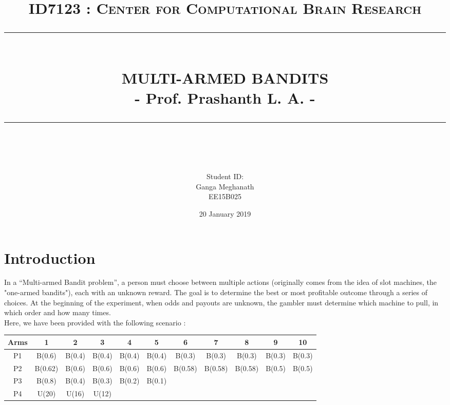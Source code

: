\documentclass[12pt]{report}
\newcommand{\HRule}[1]{\rule{\linewidth}{#1}}
\begin{document}
\title{ \normalsize \textsc{ID7123 : Center for Computational Brain Research}
		\\ [2.0cm]
		\HRule{0.5pt} \\
		\LARGE \textbf{\uppercase{Multi-Armed Bandits}}\\
        \large{- Prof. Prashanth L. A. -}
		\HRule{2pt} \\ [0.5cm]
		\normalsize \date{20 January 2019} \vspace*{5\baselineskip}}



\author{
		Student ID:  \\ 
		Ganga Meghanath \\
		EE15B025
		}

\renewcommand\thesection{\arabic{section}}
\maketitle
\tableofcontents
\newpage

\sectionfont{\scshape}


\section{Introduction}
In a ``Multi-armed Bandit problem'', a person must choose between multiple actions (originally comes from the idea of slot machines, the "one-armed bandits"), each with an unknown reward. The goal is to determine the best or most profitable outcome through a series of choices. At the beginning of the experiment, when odds and payouts are unknown, the gambler must determine which machine to pull, in which order and how many times. \\

\noindent Here, we have been provided with the following scenario :
\begin{table}[H]
  \centering
  \begin{tabular}{ | c | c | c | c | c | c | c | c | c | c | c |}
    \hline
    \textbf{Arms} & \textbf{1} & \textbf{2} & \textbf{3} & \textbf{4} & \textbf{5} & \textbf{6} & \textbf{7} & \textbf{8} & \textbf{9} & \textbf{10}\\ 
    \hline
    P1 & B(0.6) & B(0.4) & B(0.4) & B(0.4) & B(0.4) & B(0.3) & B(0.3) & B(0.3) & B(0.3) & B(0.3)\\
    \hline
    P2 & B(0.62) & B(0.6) & B(0.6) & B(0.6) & B(0.6) & B(0.58) & B(0.58) & B(0.58) & B(0.5) & B(0.5)\\
    \hline
    P3 & B(0.8) & B(0.4) & B(0.3) & B(0.2) & B(0.1) & & & & &\\
    \hline
    P4 & U(20) & U(16) & U(12) & & & & & & &\\
	\hline
  \end{tabular}
\end{table}
\end{document}
